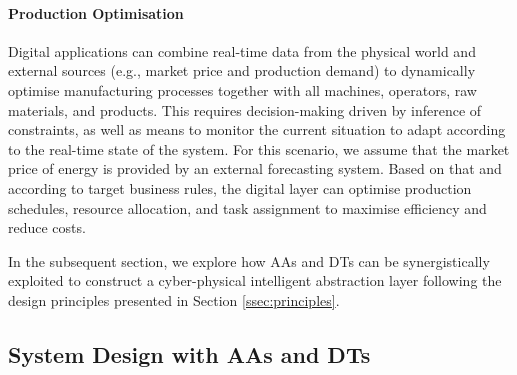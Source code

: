 \paragraph{Production Optimisation}
Digital applications can combine real-time data from the physical world and external sources (e.g., market price and production demand) to dynamically optimise manufacturing processes together with all machines, operators, raw materials, and products.
%
This requires decision-making driven by inference of constraints, as well as means to monitor the current situation to adapt according to the real-time state of the system.
%
For this scenario, we assume that the market price of energy is provided by an external forecasting system. Based on that and according to target business rules, the digital layer can optimise production schedules, resource allocation, and task assignment to maximise efficiency and reduce costs.

\medskip
In the subsequent section, we explore how AAs and DTs can be synergistically exploited to construct a cyber-physical intelligent abstraction layer following the design principles presented in Section \ref{ssec:principles}. %

\subsection{System Design with AAs and DTs}
\label{ssec:system_design_aas_dts}

